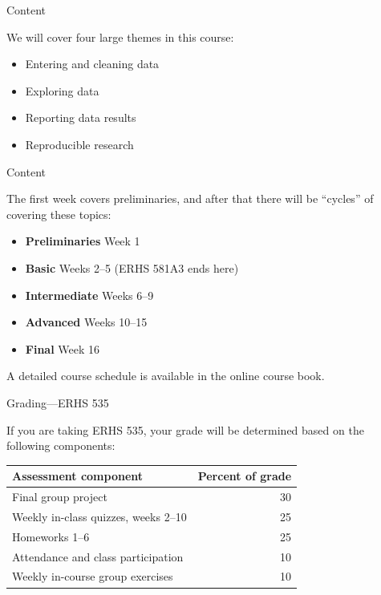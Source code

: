 \documentclass[
  10pt,
  ignorenonframetext,
]{beamer}
\providecommand{\tightlist}{%
  \setlength{\itemsep}{0pt}\setlength{\parskip}{0pt}}
\begin{document}
\begin{frame}{Content}
\protect\hypertarget{content}{}

We will cover four large themes in this course:

\begin{itemize}
\tightlist
\item
  Entering and cleaning data
\item
  Exploring data
\item
  Reporting data results
\item
  Reproducible research
\end{itemize}

\end{frame}

\begin{frame}{Content}
\protect\hypertarget{content-1}{}

The first week covers preliminaries, and after that there will be
``cycles'' of covering these topics:

\begin{itemize}
\tightlist
\item
  \textbf{Preliminaries} Week 1
\item
  \textbf{Basic} Weeks 2--5 (ERHS 581A3 ends here)
\item
  \textbf{Intermediate} Weeks 6--9
\item
  \textbf{Advanced} Weeks 10--15
\item
  \textbf{Final} Week 16
\end{itemize}

A detailed course schedule is available in the online course book.

\end{frame}

\begin{frame}{Grading---ERHS 535}
\protect\hypertarget{gradingerhs-535}{}

If you are taking ERHS 535, your grade will be determined based on the
following components:

\begin{longtable}[]{@{}lr@{}}
\toprule
Assessment component & Percent of grade\tabularnewline
\midrule
\endhead
Final group project & 30\tabularnewline
Weekly in-class quizzes, weeks 2--10 & 25\tabularnewline
Homeworks 1--6 & 25\tabularnewline
Attendance and class participation & 10\tabularnewline
Weekly in-course group exercises & 10\tabularnewline
\bottomrule
\end{longtable}

\end{frame}
\end{document}
